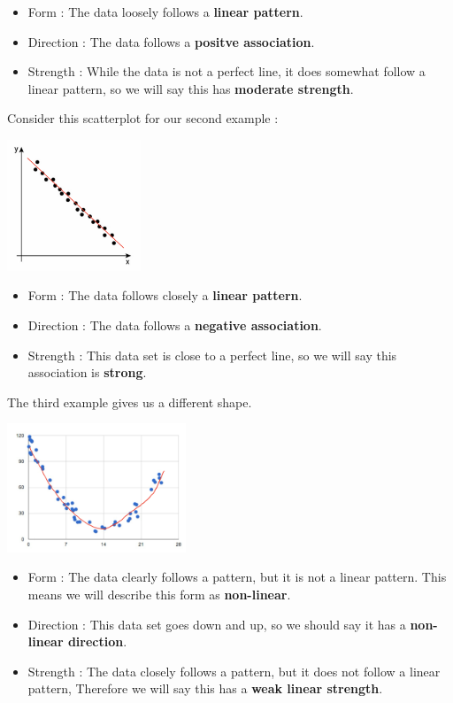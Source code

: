 \documentclass[
  letterpaper,
  DIV=11,
  numbers=noendperiod]{scrreprt}
\providecommand{\tightlist}{%
  \setlength{\itemsep}{0pt}\setlength{\parskip}{0pt}}\usepackage{longtable,booktabs,array}
\begin{document}
\begin{itemize}
\tightlist
\item
  Form : The data loosely follows a \textbf{linear pattern}.
\item
  Direction : The data follows a \textbf{positve association}.
\item
  Strength : While the data is not a perfect line, it does somewhat
  follow a linear pattern, so we will say this has \textbf{moderate
  strength}.
\end{itemize}

Consider this scatterplot for our second example :

\includegraphics[width=0.3\textwidth,height=\textheight]{./images/SC_2.jpg}

\begin{itemize}
\tightlist
\item
  Form : The data follows closely a \textbf{linear pattern}.
\item
  Direction : The data follows a \textbf{negative association}.
\item
  Strength : This data set is close to a perfect line, so we will say
  this association is \textbf{strong}.
\end{itemize}

The third example gives us a different shape.

\includegraphics[width=0.4\textwidth,height=\textheight]{./images/SC_3.jpg}

\begin{itemize}
\tightlist
\item
  Form : The data clearly follows a pattern, but it is not a linear
  pattern. This means we will describe this form as \textbf{non-linear}.
\item
  Direction : This data set goes down and up, so we should say it has a
  \textbf{non-linear direction}.
\item
  Strength : The data closely follows a pattern, but it does not follow
  a linear pattern, Therefore we will say this has a \textbf{weak linear
  strength}.
\end{itemize}
\end{document}
